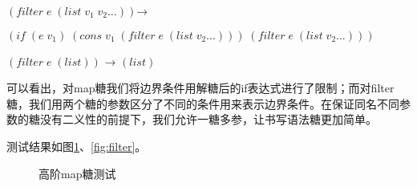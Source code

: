 \begin{flushleft}
	$(filter\;e\;(list\;v_1\;v_2\ldots))$→
	
	$(if\;(e\;v_1)\;(cons\;v_1\;(filter\;e\;(list\;v_2\ldots)))\;(filter\;e\;(list\;v_2\ldots)))$
	
	$(filter\;e\;(list))$ → $(list)$
\end{flushleft}

可以看出，对map糖我们将边界条件用解糖后的if表达式进行了限制；而对filter糖，我们用两个糖的参数区分了不同的条件用来表示边界条件。在保证同名不同参数的糖没有二义性的前提下，我们允许一糖多参，让书写语法糖更加简单。

测试结果如图\ref{fig:map}、\ref{fig:filter}。
\begin{figure}[ht]
	\begin{center}
	\end{center}
	\caption{高阶map糖测试}
\label{fig:map}
\end{figure}

